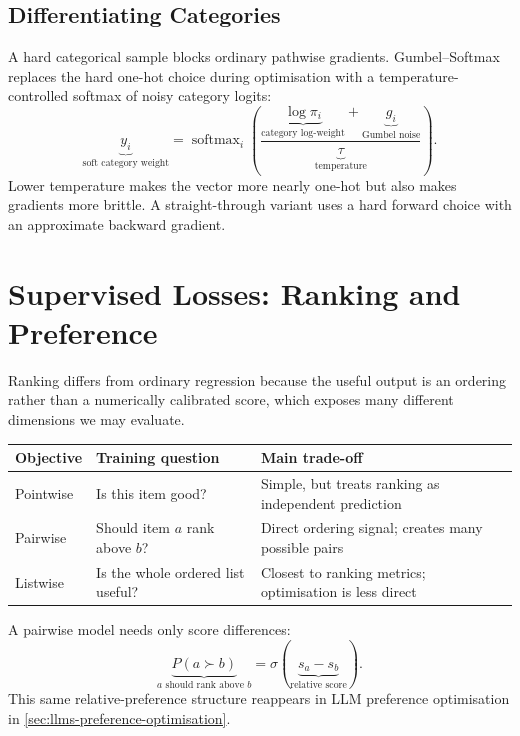 \subsection{Differentiating Categories}
\label{sec:models-gumbel-softmax-differentiable-categorical-choices}
A hard categorical sample blocks ordinary pathwise gradients.
Gumbel--Softmax replaces the hard one-hot choice during optimisation with a temperature-controlled softmax of noisy category logits:
\[
    \underbrace{y_i}_{\text{soft category weight}}
    =
    \operatorname{softmax}_i\!\left(
    \frac{\underbrace{\log\pi_i}_{\text{category log-weight}}+\underbrace{g_i}_{\text{Gumbel noise}}}{\underbrace{\tau}_{\text{temperature}}}
    \right).
\]
Lower temperature makes the vector more nearly one-hot but also makes gradients more brittle.
A straight-through variant uses a hard forward choice with an approximate backward gradient.

\section{Supervised Losses: Ranking and Preference}
\label{sec:objectives-ranking-and-preference-objectives}
Ranking differs from ordinary regression because the useful output is an ordering rather than a numerically calibrated score, which exposes many different dimensions we may evaluate.
\begin{center}
    \small
    \begin{tabularx}{.96\linewidth}{@{}L{.18\linewidth}L{.28\linewidth}Y@{}}
    \toprule
    \textbf{Objective} & \textbf{Training question} & \textbf{Main trade-off} \\
    \midrule
    Pointwise & Is this item good? & Simple, but treats ranking as independent prediction \\
    Pairwise & Should item $a$ rank above $b$? & Direct ordering signal; creates many possible pairs \\
    Listwise & Is the whole ordered list useful? & Closest to ranking metrics; optimisation is less direct \\
    \bottomrule
    \end{tabularx}
\end{center}

A pairwise model needs only score differences:
\[
    \underbrace{P(a\succ b)}_{\text{$a$ should rank above $b$}}
    =
    \sigma\!\left(
    \underbrace{s_a-s_b}_{\text{relative score}}
    \right).
\]
This same relative-preference structure reappears in LLM preference optimisation in \cref{sec:llms-preference-optimisation}.

